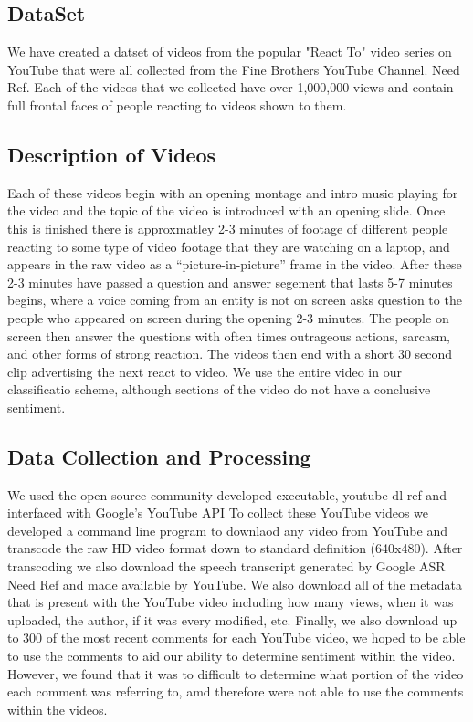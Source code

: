 \documentclass[twoside]{article}
\begin{document}
\begin{multicols}{2}

\section{DataSet}
We have created a datset of videos from the popular "React To" video series on YouTube that were all collected from the Fine Brothers YouTube Channel. {\color{red} Need Ref}.
Each of the videos that we collected have over 1,000,000 views and contain full frontal faces of people reacting to videos shown to them.

\subsection{Description of Videos}
Each of these videos begin with an opening montage and intro music playing for the video and the topic of the video is introduced with an opening slide.
Once this is finished there is approxmatley 2-3 minutes of footage of different people reacting to some type of video footage that they are watching on a laptop, and appears in the raw video as a ``picture-in-picture'' frame in the video.
After these 2-3 minutes have passed a question and answer segement that lasts 5-7 minutes begins, where a voice coming from an entity is not on screen asks question to the people who appeared on screen during the opening 2-3 minutes.  
The people on screen then answer the questions with often times outrageous actions, sarcasm, and other forms of strong reaction.
The videos then end with a short 30 second clip advertising the next react to video.
We use the entire video in our classificatio scheme, although sections of the video do not have a conclusive sentiment.

\subsection{Data Collection and Processing}
We used the open-source community developed executable, youtube-dl {\color{red} ref} and interfaced with Google's YouTube API  
To collect these YouTube videos we developed a command line program to downlaod any video from YouTube and transcode the raw HD video format down to standard definition (640x480).
After transcoding we also download the speech transcript generated by Google ASR {\color{red}Need Ref} and made available by YouTube.  
We also download all of the metadata that is present with the YouTube video including how many views, when it was uploaded, the author, if it was every modified, etc.
Finally, we also download up to 300 of the most recent comments for each YouTube video, we hoped to be able to use the comments to aid our ability to determine sentiment within the video.
However, we found that it was to difficult to determine what portion of the video each comment was referring to, amd therefore were not able to use the comments within the videos.


\end{multicols}
\end{document}
